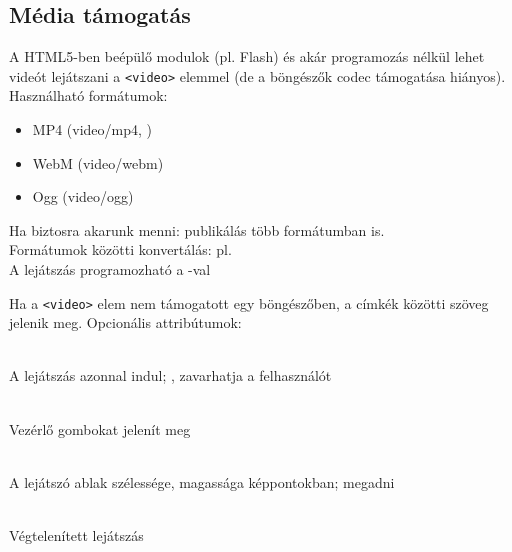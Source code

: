 \subsection{Média támogatás}

\begin{frame}
  A HTML5-ben beépülő modulok (pl. Flash) és akár programozás nélkül 
  lehet videót lejátszani a \texttt{<video>} elemmel (de a böngészők codec 
  támogatása hiányos). Használható formátumok:
  \begin{itemize}
    \item MP4 (video/mp4, )
    \item WebM (video/webm)
    \item Ogg (video/ogg)
  \end{itemize}
  Ha biztosra akarunk menni: publikálás több formátumban is.\\
  Formátumok közötti konvertálás: pl. 
  \\
  A lejátszás programozható a -val\\
\end{frame}

\begin{frame}
  Ha a \texttt{<video>} elem nem támogatott egy böngészőben, a 
  címkék közötti szöveg jelenik meg. Opcionális attribútumok:
  \begin{description}[m]
    \item[\texttt{autoplay}] \hfill \\ A lejátszás azonnal indul; 
    , zavarhatja a felhasználót
    \item[\texttt{controls}] \hfill \\ Vezérlő gombokat jelenít meg
    \item[\texttt{width}, \texttt{height}] \hfill \\ A lejátszó 
    ablak szélessége, magassága képpontokban;  megadni
    \item[\texttt{loop}] \hfill \\ Végtelenített lejátszás
  \end{description}
\end{frame}

